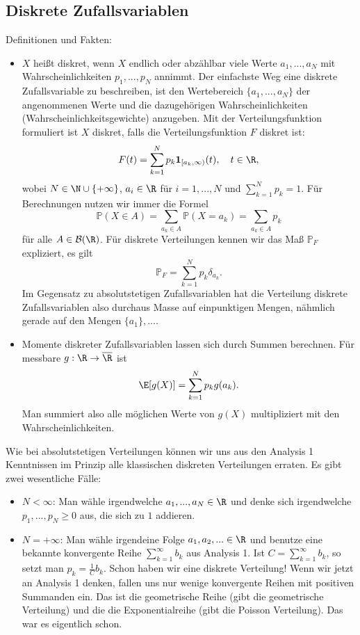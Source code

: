 \subsection{Diskrete Zufallsvariablen}
Definitionen und Fakten:
\begin{itemize}
	\item $X$ hei\ss t diskret, wenn $X$ endlich oder abz\"ahlbar viele Werte $a_1,...,a_N$ mit Wahrscheinlichkeiten $p_1,...,p_N$ annimmt. Der einfachste Weg eine diskrete Zufallsvariable zu beschreiben, ist den Wertebereich $\{a_1,...,a_N\}$ der angenommenen Werte und die dazugeh\"origen Wahrscheinlichkeiten (Wahrscheinlichkeitsgewichte) anzugeben. Mit der Verteilungsfunktion formuliert ist $X$ diskret, falls die Verteilungsfunktion $F$ diskret ist: $$F(t)=\sum_{k=1}^N p_k \mathbf 1_{[a_k,\infty)}(t),\quad t\in\R,$$ wobei $N\in \N\cup \{+\infty\}$, $a_i\in\R$ f\"ur $i=1,...,N$ und $\sum_{k=1}^N p_k=1$. F\"ur Berechnungen nutzen wir immer die Formel
	 $$\mathbb P(X\in A)=\sum_{a_k\in A} \mathbb P(X=a_k)=\sum_{a_k\in A} p_k$$ f\"ur alle $A\in \mathcal B(\R)$. 
	F\"ur diskrete Verteilungen kennen wir das Ma\ss{} $\mathbb P_F$ expliziert, es gilt
	$$\mathbb P_F=\sum_{k=1}^N p_k \delta_{a_k}.$$
	Im Gegensatz zu absolutstetigen Zufallsvariablen hat die Verteilung diskrete Zufallsvariablen also durchaus Masse auf einpunktigen Mengen, n\"ahmlich gerade auf den Mengen $\{a_1\}, ...$.
	\item Momente diskreter Zufallsvariablen lassen sich durch Summen berechnen. F\"ur messbare $g:\R\to \overline \R$ ist
	\begin{align*}
		\E[g(X)]=\sum_{k=1}^N p_k g(a_k).
	\end{align*}
	Man summiert also alle m\"oglichen Werte von $g(X)$ multipliziert mit den Wahrscheinlichkeiten.
\end{itemize}
Wie bei absolutstetigen Verteilungen k\"onnen wir uns aus den Analysis 1 Kenntnissen im Prinzip alle klassischen diskreten Verteilungen erraten. Es gibt zwei wesentliche F\"alle:
\begin{itemize}
	\item $N<\infty$: Man w\"ahle irgendwelche $a_1,...,a_N\in\R$ und denke sich irgendwelche $p_1,...,p_N \geq 0$ aus, die sich zu $1$ addieren.
	\item $N=+\infty$: Man w\"ahle irgendeine Folge $a_1,a_2,...\in \R$ und benutze eine bekannte konvergente Reihe $\sum_{k=1}^\infty b_k$ aus Analysis 1. Ist $C=\sum_{k=1}^\infty b_k$, so setzt man $p_k=\frac 1 C b_k$. Schon haben wir eine diskrete Verteilung! Wenn wir jetzt an Analysis 1 denken, fallen uns nur wenige konvergente Reihen mit positiven Summanden ein. Das ist die 
	geometrische Reihe (gibt die geometrische Verteilung) und die die Exponentialreihe (gibt die Poisson Verteilung). Das war es eigentlich schon.
\end{itemize}



